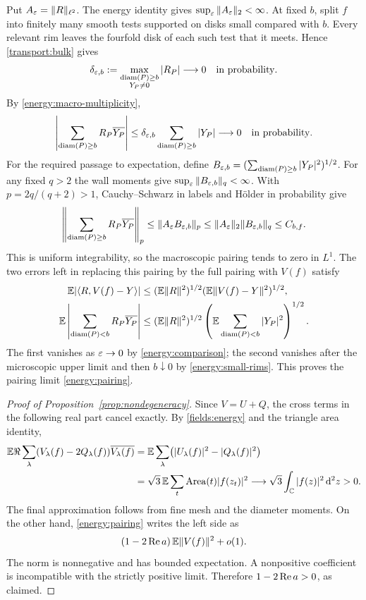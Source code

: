 Put $A_\varepsilon=\|R\|_{\ell^2}$.
The energy identity gives $\sup_\varepsilon\|A_\varepsilon\|_2<\infty$.
At fixed $b$, split $f$ into finitely many smooth tests supported on disks
small compared with $b$. Every relevant rim leaves the fourfold disk of
each such test that it meets. Hence \eqref{transport:bulk} gives
\[
 \delta_{\varepsilon,b}:=\max_{\substack{\operatorname{diam}(P)\ge b\\Y_P\ne0}}
                           |R_P|\longrightarrow0
 \quad\text{in probability}.
\]
By \eqref{energy:macro-multiplicity},
\[
 \left|\sum_{\operatorname{diam}(P)\ge b}R_P\overline{Y_P}\right|
 \le\delta_{\varepsilon,b}\sum_{\operatorname{diam}(P)\ge b}|Y_P|
 \longrightarrow0
 \quad\text{in probability}.
\]
For the required passage to expectation, define
$B_{\varepsilon,b}=(\sum_{\operatorname{diam}(P)\ge b}|Y_P|^2)^{1/2}$.
For any fixed $q>2$ the wall moments give
$\sup_\varepsilon\|B_{\varepsilon,b}\|_q<\infty$. With
$p=2q/(q+2)>1$, Cauchy--Schwarz in labels and H\"older in probability give
\begin{equation}
 \left\|\sum_{\operatorname{diam}(P)\ge b}R_P\overline{Y_P}\right\|_p
 \le\|A_\varepsilon B_{\varepsilon,b}\|_p
 \le\|A_\varepsilon\|_2\|B_{\varepsilon,b}\|_q\le C_{b,f}.
 \label{energy:macro-ui}
\end{equation}
This is uniform integrability, so the macroscopic pairing tends to zero
in $L^1$. The two errors left in replacing this pairing by the full
pairing with $V(f)$ satisfy
\begin{align*}
 \mathbb E|\langle R,V(f)-Y\rangle|
 &\le (\mathbb E\|R\|^2)^{1/2}
            (\mathbb E\|V(f)-Y\|^2)^{1/2},\\
 \mathbb E\left|\sum_{\operatorname{diam}(P)<b}R_P\overline{Y_P}\right|
 &\le (\mathbb E\|R\|^2)^{1/2}
       \left(\mathbb E\sum_{\operatorname{diam}(P)<b}|Y_P|^2\right)^{1/2}.
\end{align*}
The first vanishes as $\varepsilon\to0$ by \eqref{energy:comparison}; the second
vanishes after the microscopic upper limit and then $b\downarrow0$ by
\eqref{energy:small-rims}. This proves the pairing limit
\eqref{energy:pairing}.

\begin{proof}[Proof of Proposition~\ref{prop:nondegeneracy}]
Since $V=U+Q$, the cross terms in the following real part cancel exactly.
By \eqref{fields:energy} and the triangle area identity,
\begin{align*}
 \mathbb E\Re\sum_\lambda(V_\lambda(f)-2Q_\lambda(f))
                                      \overline{V_\lambda(f)}
 &=\mathbb E\sum_\lambda\bigl(|U_\lambda(f)|^2-|Q_\lambda(f)|^2\bigr)\\
 &=\sqrt3\,\mathbb E\sum_t\operatorname{Area}(t)|f(z_t)|^2
 \longrightarrow\sqrt3\int_\mathbb C|f(z)|^2\,\mathrm d^2z>0.
\end{align*}
The final approximation follows from fine mesh and the diameter moments.
On the other hand, \eqref{energy:pairing} writes the left side as
\[
              (1-2\operatorname{Re} a)\,\mathbb E\|V(f)\|^2+o(1).
\]
The norm is nonnegative and has bounded expectation. A nonpositive
coefficient is incompatible with the strictly positive limit. Therefore
$1-2\operatorname{Re} a>0$, as claimed.
\end{proof}
